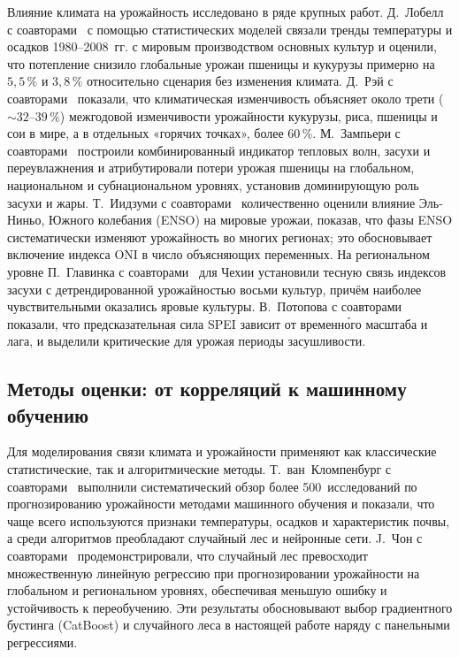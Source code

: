 \documentclass[14pt,a4paper]{extarticle}
\begin{document}
Влияние климата на урожайность исследовано в ряде крупных работ. Д.~Лобелл с соавторами~\cite{lobell2011} с помощью статистических моделей связали тренды температуры и осадков 1980--2008~гг. с мировым производством основных культур и оценили, что потепление снизило глобальные урожаи пшеницы и кукурузы примерно на $5{,}5\,\%$ и $3{,}8\,\%$ относительно сценария без изменения климата. Д.~Рэй с соавторами~\cite{ray2015} показали, что климатическая изменчивость объясняет около трети ($\sim 32$--$39\,\%$) межгодовой изменчивости урожайности кукурузы, риса, пшеницы и сои в мире, а в отдельных «горячих точках», более $60\,\%$. М.~Зампьери с соавторами~\cite{zampieri2017} построили комбинированный индикатор тепловых волн, засухи и переувлажнения и атрибутировали потери урожая пшеницы на глобальном, национальном и субнациональном уровнях, установив доминирующую роль засухи и жары. Т.~Иидзуми с соавторами~\cite{iizumi2014} количественно оценили влияние Эль-Ниньо, Южного колебания (ENSO) на мировые урожаи, показав, что фазы ENSO систематически изменяют урожайность во многих регионах; это обосновывает включение индекса ONI в число объясняющих переменных. На региональном уровне П.~Главинка с соавторами~\cite{hlavinka2009} для Чехии установили тесную связь индексов засухи с детрендированной урожайностью восьми культур, причём наиболее чувствительными оказались яровые культуры. В.~Потопова с соавторами~\cite{potopova2015} показали, что предсказательная сила SPEI зависит от временно́го масштаба и лага, и выделили критические для урожая периоды засушливости.

\subsection{Методы оценки: от корреляций к машинному обучению}

Для моделирования связи климата и урожайности применяют как классические статистические, так и алгоритмические методы. Т.~ван~Кломпенбург с соавторами~\cite{vanklompenburg2020} выполнили систематический обзор более 500~исследований по прогнозированию урожайности методами машинного обучения и показали, что чаще всего используются признаки температуры, осадков и характеристик почвы, а среди алгоритмов преобладают случайный лес и нейронные сети. J.~Чон с соавторами~\cite{jeong2016} продемонстрировали, что случайный лес превосходит множественную линейную регрессию при прогнозировании урожайности на глобальном и региональном уровнях, обеспечивая меньшую ошибку и устойчивость к переобучению. Эти результаты обосновывают выбор градиентного бустинга (CatBoost) и случайного леса в настоящей работе наряду с панельными регрессиями.
\end{document}
